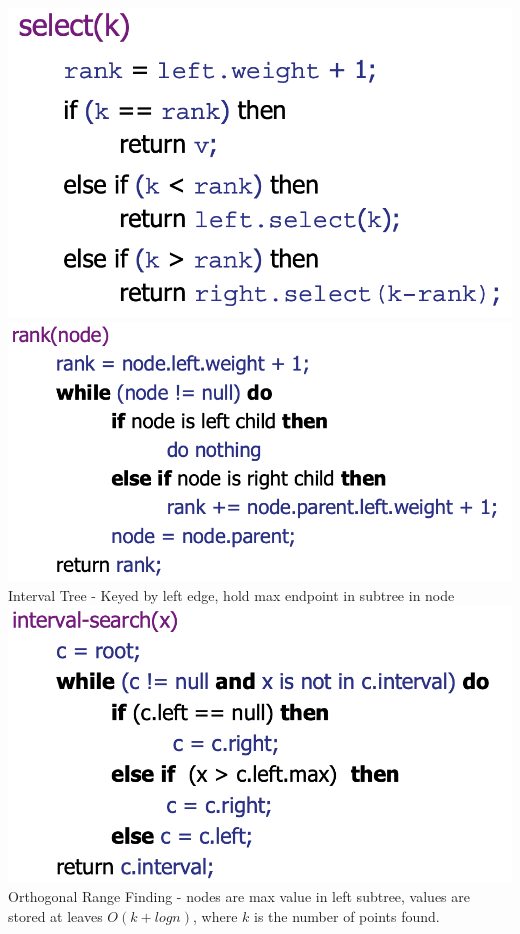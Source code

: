 \documentclass[10pt, a4paper]{article}
\begin{document}
\begin{multicols*}{3}
		\includegraphics[scale=0.25]{./assets/Select} \includegraphics[scale=.3]{./assets/rank}\\
		Interval Tree - Keyed by left edge, hold max endpoint in subtree in node\\
		\includegraphics[scale=.25]{./assets/Interval}\\
		Orthogonal Range Finding - nodes are max value in left subtree, values are stored at leaves $O(k + logn)$, where $k$ is the number of points found.\\

\end{multicols*}
\end{document}
